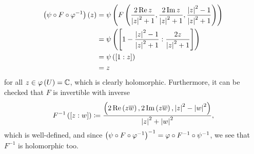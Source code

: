 \documentclass[../Moduli_Spaces_of_Riemann_Surfaces.tex]{subfiles}
\begin{document}
\begin{example}
\begin{equation*}
            \begin{aligned}
                \left(\psi\circ F\circ\varphi^{-1}\right)\left(z\right)&=\psi\left(F\left(\frac{2\operatorname{Re} z}{\left|z\right|^2+1},\frac{2\operatorname{Im} z}{\left|z\right|^2+1},\frac{\left|z\right|^2-1}{\left|z\right|^2+1}\right)\right) \\
                                                      &=\psi\left(\left[1-\frac{\left|z\right|^2-1}{\left|z\right|^2+1}:\frac{2z}{\left|z\right|^2+1}\right]\right) \\
                                                      &=\psi\left(\left[1:z\right]\right) \\
                                                      &=z
            \end{aligned}
        \end{equation*}
        for all $z\in\varphi\left(U\right)=\mathbb{C}$, which is clearly holomorphic. Furthermore, it can be checked that $F$ is invertible with inverse\side{}
        \begin{equation*}
            F^{-1}\left(\left[z:w\right]\right)\coloneqq\frac{\left(2\operatorname{Re}\left(z\overline{w}\right),2\operatorname{Im}\left(z\overline{w}\right),\left|z\right|^2-\left|w\right|^2\right)}{\left|z\right|^2+\left|w\right|^2},
        \end{equation*}
        which is well-defined, and since $\left(\psi\circ F\circ\varphi^{-1}\right)^{-1}=\varphi\circ F^{-1}\circ\psi^{-1}$, we see that $F^{-1}$ is holomorphic too.\exqed
    \end{example}
\end{document}

